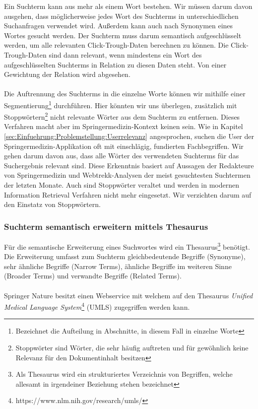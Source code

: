 Ein Suchterm kann aus mehr als einem Wort bestehen. Wir müssen darum davon ausgehen, dass möglicherweise jedes Wort des Suchterms in unterschiedlichen Suchanfragen verwendet wird. Außerdem kann auch nach Synonymen eines Wortes gesucht werden. Der Suchterm muss darum semantisch aufgeschlüsselt werden, um alle relevanten Click-Trough-Daten berechnen zu können. Die Click-Trough-Daten sind dann relevant, wenn mindestens ein Wort des aufgeschlüsselten Suchterms in Relation zu diesen Daten steht. Von einer Gewichtung der Relation wird abgesehen.
\\
\\
Die Auftrennung des Suchterms in die einzelne Worte können wir mithilfe einer Segmentierung\footnote{Bezeichnet die Aufteilung in Abschnitte, in diesem Fall in einzelne Worte} durchführen. Hier könnten wir uns überlegen, zusätzlich mit Stoppwörtern\footnote{Stoppwörter sind Wörter, die sehr häufig auftreten und für gewöhnlich keine Relevanz für den Dokumentinhalt besitzen} nicht relevante Wörter aus dem Suchterm zu entfernen. Dieses Verfahren macht aber im Springermedizin-Kontext keinen sein. Wie in Kapitel \ref{sec:Einfuehrung:Problemstellung:Userrelevanz} angesprochen, suchen die User der Springermedizin-Applikation oft mit einschlägig, fundierten Fachbegriffen. Wir gehen darum davon aus, dass alle Wörter des verwendeten Suchterms für das Suchergebnis relevant sind. Diese Erkenntnis basiert auf Aussagen der Redakteure von Springermedizin und Webtrekk-Analysen der meist gesuchtesten Suchtermen der letzten Monate. Auch sind Stoppwörter veraltet und werden in modernen Information Retrieval Verfahren nicht mehr eingesetzt. Wir verzichten darum auf den Einstatz von Stoppwörtern.

\subsubsection{Suchterm semantisch erweitern mittels Thesaurus}
\label{sec:Einfuehrung:Methodik:Click-Trough-Daten:SuchtermThesaurus}

Für die semantische Erweiterung eines Suchwortes wird ein Thesaurus\footnote{Als Thesaurus wird ein strukturiertes Verzeichnis von Begriffen, welche allesamt in irgendeiner Beziehung stehen bezeichnet} benötigt. Die Erweiterung umfasst zum Suchterm gleichbedeutende Begriffe (Synonyme), sehr ähnliche Begriffe (Narrow Terms), ähnliche Begriffe im weiteren Sinne (Broader Terms) und verwandte Begriffe (Related Terms).
\\
\\
Springer Nature besitzt einen Webservice mit welchem auf den Thesaurus \textit{Unified Medical Language System}\footnote{https://www.nlm.nih.gov/research/umls/} (UMLS) zugegriffen werden kann. 

